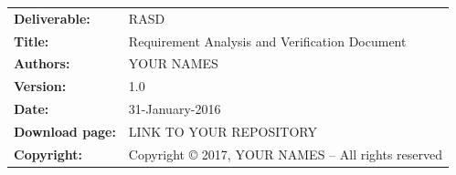 \documentclass{config/PoliMi3i_thesis}
\begin{document}


\pagestyle{empty} %
\frontmatter %


\renewcommand{\headrulewidth}{0pt} %
\begin{table}[h!]
    \begin{tabu} to \textwidth { X[0.3,r,p] X[0.7,l,p] }
        \hline

        \textbf{Deliverable:}   & RASD                                               \\
        \textbf{Title:}         & Requirement Analysis and Verification Document     \\
        \textbf{Authors:}       & YOUR NAMES                                         \\
        \textbf{Version:}       & 1.0                                                \\
        \textbf{Date:}          & 31-January-2016                                    \\
        \textbf{Download page:} & LINK TO YOUR REPOSITORY                            \\
        \textbf{Copyright:}     & Copyright © 2017, YOUR NAMES – All rights reserved \\
        \hline
    \end{tabu}
\end{table}

\startpreamble
\setcounter{page}{1} %
\end{document}
